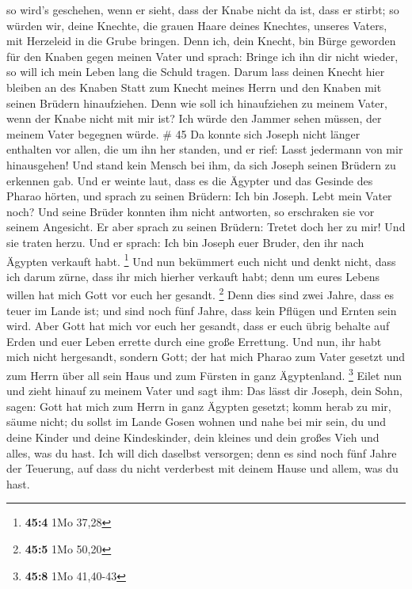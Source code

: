 so wird's geschehen, wenn er sieht, dass der Knabe nicht
da ist, dass er stirbt; so würden wir, deine Knechte, die grauen Haare
deines Knechtes, unseres Vaters, mit Herzeleid in die Grube bringen.
 Denn ich, dein Knecht, bin Bürge geworden für den Knaben
gegen meinen Vater und sprach: Bringe ich ihn dir nicht wieder, so will
ich mein Leben lang die Schuld tragen.  Darum lass deinen
Knecht hier bleiben an des Knaben Statt zum Knecht meines Herrn und den
Knaben mit seinen Brüdern hinaufziehen.  Denn wie soll ich
hinaufziehen zu meinem Vater, wenn der Knabe nicht mit mir ist? Ich
würde den Jammer sehen müssen, der meinem Vater begegnen würde. \# 45
 Da konnte sich Joseph nicht länger enthalten vor allen, die
um ihn her standen, und er rief: Lasst jedermann von mir hinausgehen!
Und stand kein Mensch bei ihm, da sich Joseph seinen Brüdern zu erkennen
gab.  Und er weinte laut, dass es die Ägypter und das
Gesinde des Pharao hörten,  und sprach zu seinen Brüdern:
Ich bin Joseph. Lebt mein Vater noch? Und seine Brüder konnten ihm nicht
antworten, so erschraken sie vor seinem Angesicht.  Er aber
sprach zu seinen Brüdern: Tretet doch her zu mir! Und sie traten herzu.
Und er sprach: Ich bin Joseph euer Bruder, den ihr nach Ägypten verkauft
habt. \footnote{\textbf{45:4} 1Mo 37,28}  Und nun bekümmert
euch nicht und denkt nicht, dass ich darum zürne, dass ihr mich hierher
verkauft habt; denn um eures Lebens willen hat mich Gott vor euch her
gesandt. \footnote{\textbf{45:5} 1Mo 50,20}  Denn dies sind
zwei Jahre, dass es teuer im Lande ist; und sind noch fünf Jahre, dass
kein Pflügen und Ernten sein wird.  Aber Gott hat mich vor
euch her gesandt, dass er euch übrig behalte auf Erden und euer Leben
errette durch eine große Errettung.  Und nun, ihr habt mich
nicht hergesandt, sondern Gott; der hat mich Pharao zum Vater gesetzt
und zum Herrn über all sein Haus und zum Fürsten in ganz Ägyptenland.
\footnote{\textbf{45:8} 1Mo 41,40-43}  Eilet nun und zieht
hinauf zu meinem Vater und sagt ihm: Das lässt dir Joseph, dein Sohn,
sagen: Gott hat mich zum Herrn in ganz Ägypten gesetzt; komm herab zu
mir, säume nicht;  du sollst im Lande Gosen wohnen und nahe
bei mir sein, du und deine Kinder und deine Kindeskinder, dein kleines
und dein großes Vieh und alles, was du hast.  Ich will dich
daselbst versorgen; denn es sind noch fünf Jahre der Teuerung, auf dass
du nicht verderbest mit deinem Hause und allem, was du hast.
